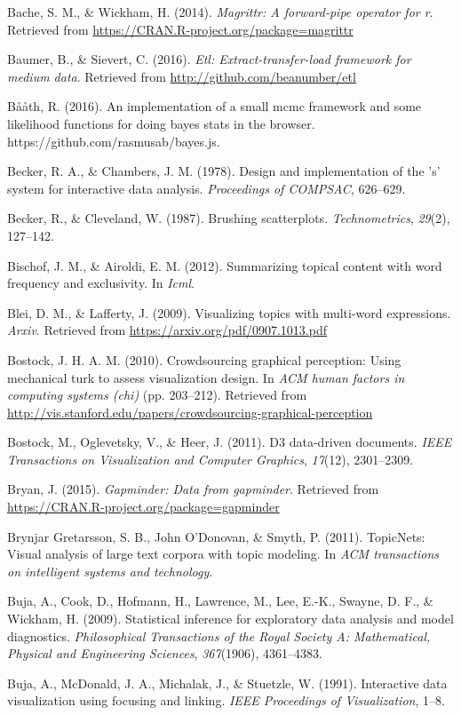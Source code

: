 \documentclass[12pt,]{isuthesis}
\begin{document}
\hypertarget{ref-magrittr}{}
Bache, S. M., \& Wickham, H. (2014). \emph{Magrittr: A forward-pipe operator for r}. Retrieved from \url{https://CRAN.R-project.org/package=magrittr}

\hypertarget{ref-etl}{}
Baumer, B., \& Sievert, C. (2016). \emph{Etl: Extract-transfer-load framework for medium data}. Retrieved from \url{http://github.com/beanumber/etl}

\hypertarget{ref-bayes-js}{}
Bååth, R. (2016). An implementation of a small mcmc framework and some
likelihood functions for doing bayes stats in the browser.
https://github.com/rasmusab/bayes.js.

\hypertarget{ref-S:1978}{}
Becker, R. A., \& Chambers, J. M. (1978). Design and implementation of
the 's' system for interactive data analysis. \emph{Proceedings of
COMPSAC}, 626--629.

\hypertarget{ref-brushing-scatterplots}{}
Becker, R., \& Cleveland, W. (1987). Brushing scatterplots.
\emph{Technometrics}, \emph{29}(2), 127--142.

\hypertarget{ref-Bischof}{}
Bischof, J. M., \& Airoldi, E. M. (2012). Summarizing topical content
with word frequency and exclusivity. In \emph{Icml}.

\hypertarget{ref-Blei-2009}{}
Blei, D. M., \& Lafferty, J. (2009). Visualizing topics with multi-word
expressions. \emph{Arxiv}. Retrieved from
\url{https://arxiv.org/pdf/0907.1013.pdf}

\hypertarget{ref-crowdsourcing-graphical-perception}{}
Bostock, J. H. A. M. (2010). Crowdsourcing graphical perception: Using
mechanical turk to assess visualization design. In \emph{ACM human
factors in computing systems (chi)} (pp. 203--212). Retrieved from
\url{http://vis.stanford.edu/papers/crowdsourcing-graphical-perception}

\hypertarget{ref-d3}{}
Bostock, M., Oglevetsky, V., \& Heer, J. (2011). D3 data-driven
documents. \emph{IEEE Transactions on Visualization and Computer
Graphics}, \emph{17}(12), 2301--2309.

\hypertarget{ref-gapminder}{}
Bryan, J. (2015). \emph{Gapminder: Data from gapminder}. Retrieved from
\url{https://CRAN.R-project.org/package=gapminder}

\hypertarget{ref-Gretarsson}{}
Brynjar Gretarsson, S. B., John O'Donovan, \& Smyth, P. (2011).
TopicNets: Visual analysis of large text corpora with topic modeling. In
\emph{ACM transactions on intelligent systems and technology}.

\hypertarget{ref-Buja:2009hp}{}
Buja, A., Cook, D., Hofmann, H., Lawrence, M., Lee, E.-K., Swayne, D.
F., \& Wickham, H. (2009). Statistical inference for exploratory data
analysis and model diagnostics. \emph{Philosophical Transactions of the
Royal Society A: Mathematical, Physical and Engineering Sciences},
\emph{367}(1906), 4361--4383.

\hypertarget{ref-Buja:1991vh}{}
Buja, A., McDonald, J. A., Michalak, J., \& Stuetzle, W. (1991).
Interactive data visualization using focusing and linking. \emph{IEEE
Proceedings of Visualization}, 1--8.
\end{document}
